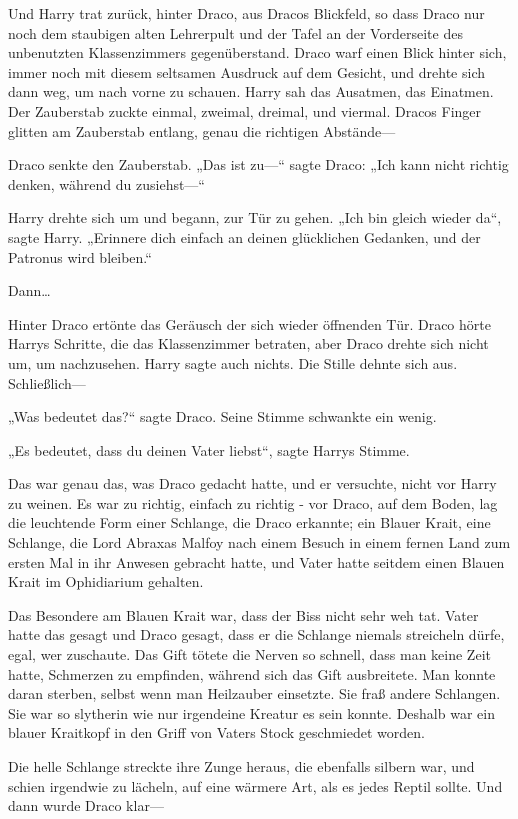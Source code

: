 {Und Harry trat zurück, hinter Draco, aus Dracos Blickfeld, so dass Draco nur noch dem staubigen alten Lehrerpult und der Tafel an der Vorderseite des unbenutzten Klassenzimmers gegenüberstand. Draco warf einen Blick hinter sich, immer noch mit diesem seltsamen Ausdruck auf dem Gesicht, und drehte sich dann weg, um nach vorne zu schauen. Harry sah das Ausatmen, das Einatmen. Der Zauberstab zuckte einmal, zweimal, dreimal, und viermal. Dracos Finger glitten am Zauberstab entlang, genau die richtigen Abstände—

Draco senkte den Zauberstab. „Das ist zu—“ sagte Draco: „Ich kann nicht richtig denken, während du zusiehst—“

Harry drehte sich um und begann, zur Tür zu gehen. „Ich bin gleich wieder da“, sagte Harry. „Erinnere dich einfach an deinen glücklichen Gedanken, und der Patronus wird bleiben.“

Dann…

Hinter Draco ertönte das Geräusch der sich wieder öffnenden Tür. Draco hörte Harrys Schritte, die das Klassenzimmer betraten, aber Draco drehte sich nicht um, um nachzusehen. Harry sagte auch nichts. Die Stille dehnte sich aus. Schließlich—

„Was bedeutet das?“ sagte Draco. Seine Stimme schwankte ein wenig.

„Es bedeutet, dass du deinen Vater liebst“, sagte Harrys Stimme.

Das war genau das, was Draco gedacht hatte, und er versuchte, nicht vor Harry zu weinen. Es war zu richtig, einfach zu richtig - vor Draco, auf dem Boden, lag die leuchtende Form einer Schlange, die Draco erkannte; ein Blauer Krait, eine Schlange, die Lord Abraxas Malfoy nach einem Besuch in einem fernen Land zum ersten Mal in ihr Anwesen gebracht hatte, und Vater hatte seitdem einen Blauen Krait im Ophidiarium gehalten.

Das Besondere am Blauen Krait war, dass der Biss nicht sehr weh tat. Vater hatte das gesagt und Draco gesagt, dass er die Schlange niemals streicheln dürfe, egal, wer zuschaute. Das Gift tötete die Nerven so schnell, dass man keine Zeit hatte, Schmerzen zu empfinden, während sich das Gift ausbreitete. Man konnte daran sterben, selbst wenn man Heilzauber einsetzte. Sie fraß andere Schlangen. Sie war so slytherin wie nur irgendeine Kreatur es sein konnte. Deshalb war ein blauer Kraitkopf in den Griff von Vaters Stock geschmiedet worden.

Die helle Schlange streckte ihre Zunge heraus, die ebenfalls silbern war, und schien irgendwie zu lächeln, auf eine wärmere Art, als es jedes Reptil sollte. Und dann wurde Draco klar—

}
